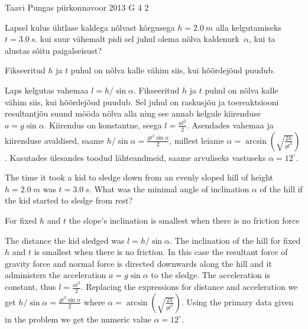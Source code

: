 {Taavi Pungas} %
{piirkonnavoor} %
{2013} %
{G 4} %
{2} %
{
\ifStatement
Lapsel kulus ühtlase kaldega nõlvast kõrgusega $h=\SI{2,0}{m}$ alla
kelgutamiseks $t=\SI{3,0}{s}$. kui suur vähemalt pidi sel juhul olema nõlva
kaldenurk~$\alpha$, kui ta alustas sõitu paigalseisust?
\fi


\ifHint
Fikseeritud $h$ ja $t$ puhul on nõlva kalle vähim siis, kui hõõrdejõud puudub.
\fi


\ifSolution
Laps kelgutas vahemaa $l=h / \sin \alpha$. Fikseeritud $h$ ja $t$ puhul on nõlva kalle vähim siis, kui hõõrdejõud puudub. Sel juhul on raskusjõu ja toereaktsiooni resultantjõu suund mööda nõlva alla ning see annab kelgule kiirenduse $a=g \sin \alpha$. Kiirendus on konstantne, seega $l=\frac{a t^2}{2}$. Asendades vahemaa ja kiirenduse avaldised, saame $h / \sin \alpha = \frac{g t^2 \sin \alpha}{2}$, millest leiame $\alpha = \arcsin( \sqrt{\frac{2h}{g t^2}})$. Kasutades ülesandes toodud lähteandmeid, saame arvuliseks vastuseks $\alpha = 12^\circ$. 
\fi


\ifEngStatement
The time it took a kid to sledge down from an evenly sloped hill of height $h=\SI{2,0}{m}$ was $t=\SI{3,0}{s}$. What was the minimal angle of inclination $\alpha$ of the hill if the kid started to sledge from rest?
\fi


\ifEngHint
For fixed $h$ and $t$ the slope’s inclination is smallest when there is no friction force
\fi


\ifEngSolution
The distance the kid sledged was $l=h / \sin \alpha$. The inclination of the hill for fixed $h$ and $t$ is smallest when there is no friction. In this case the resultant force of gravity force and normal force is directed downwards along the hill and it administers the acceleration $a=g \sin \alpha$ to the sledge. The acceleration is constant, thus $l=\frac{a t^2}{2}$. Replacing the expressions for distance and acceleration we get $h / \sin \alpha = \frac{g t^2 \sin \alpha}{2}$ where $\alpha = \arcsin( \sqrt{\frac{2h}{g t^2}})$. Using the primary data given in the problem we get the numeric value $\alpha = 12^\circ$.
\fi
}